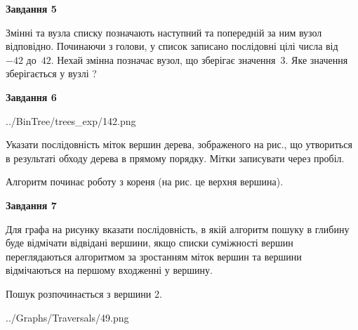 \documentclass[12pt, ukrainian]{article}
\begin{document}
{\begin {large}
{\begin {center}\textbf{Завдання 5}\end {center}}\par
Змінні  та  вузла списку позначають наступний та попередній за ним вузол відповідно. Починаючи з голови, у список записано послідовні цілі числа від~$-42$ до~$42$. Нехай змінна  позначає вузол, що зберігає значення~$3$.
Яке значення зберігається у вузлі  ?\par
\newpage

{\begin {center}\textbf{Завдання 6}\end {center}}\par

\begin{center}
	{../BinTree/trees_exp/142.png}
\end{center}
Указати послідовність міток вершин дерева, зображеного на рис., що утвориться в результаті обходу дерева в прямому порядку. Мітки записувати через пробіл.\par Алгоритм починає роботу з кореня (на рис. це верхня вершина).\par
\newpage

{\begin {center}\textbf{Завдання 7}\end {center}}\par
Для графа на рисунку вказати послідовність, в якій алгоритм пошуку в глибину буде відмічати відвідані вершини, якщо списки суміжності вершин переглядаються алгоритмом за зростанням міток вершин та вершини відмічаються на першому вход\-женні у вершину.\par
Пошук розпочинається з вершини 2.\par

\begin{center}
	{../Graphs/Traversals/49.png}
\end{center}\par
\newpage


\end{large}}
\end{document}
